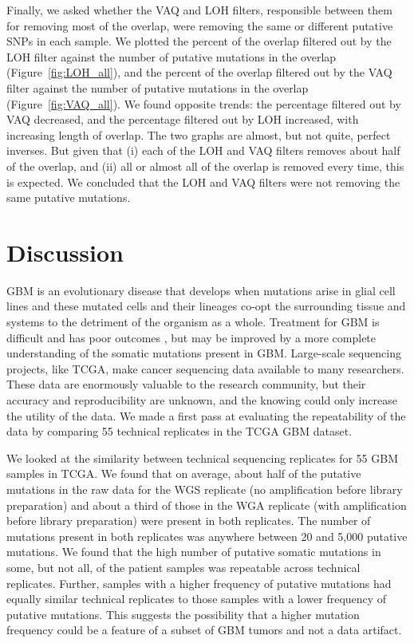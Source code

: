 \documentclass[11pt]{article} %
\begin{document}
Finally, we asked whether the VAQ and LOH filters, responsible between them for removing most of the overlap, were removing the same or different putative SNPs in each sample. We plotted the percent of the overlap filtered out by the LOH filter against the number of putative mutations in the overlap (Figure~\ref{fig:LOH_all}), and the percent of the overlap filtered out by the VAQ filter against the number of putative mutations in the overlap (Figure~\ref{fig:VAQ_all}). We found opposite trends: the percentage filtered out by VAQ decreased, and the percentage filtered out by LOH increased, with increasing length of overlap. The two graphs are almost, but not quite, perfect inverses. But given that (i) each of the LOH and VAQ filters removes about half of the overlap, and (ii) all or almost all of the overlap is removed every time, this is expected. We concluded that the LOH and VAQ filters were not removing the same putative mutations. 

\section*{Discussion}

GBM is an evolutionary disease that develops when mutations arise in glial cell lines and these mutated cells and their lineages co-opt the surrounding tissue and systems to the detriment of the organism as a whole. Treatment for GBM is difficult and has poor outcomes \citep{GBM-stats}, but may be improved by a more complete understanding of the somatic mutations present in GBM. Large-scale sequencing projects, like TCGA, make cancer sequencing data available to many researchers. These data are enormously valuable to the research community, but their accuracy and reproducibility are unknown, and the knowing could only increase the utility of the data. We made a first pass at evaluating the repeatability of the data by comparing 55 technical replicates in the TCGA GBM dataset.  

We looked at the similarity between technical sequencing replicates for 55 GBM samples in TCGA. We found that on average, about half of the putative mutations in the raw data for the WGS replicate (no amplification before library preparation) and about a third of those in the WGA replicate (with amplification before library preparation) were present in both replicates. The number of mutations present in both replicates was anywhere between 20 and 5,000 putative mutations. We found that the high number of putative somatic mutations in some, but not all, of the patient samples was repeatable across technical replicates. Further, samples with a higher frequency of putative mutations had equally similar technical replicates to those samples with a lower frequency of putative mutations. This suggests the possibility that a higher mutation frequency could be a feature of a subset of GBM tumors and not a data artifact.
\end{document}
